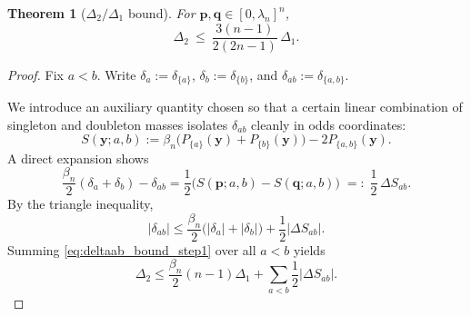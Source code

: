 \documentclass[11pt]{amsart}
\numberwithin{equation}{section}
\newtheorem{theorem}{Theorem}[section]
\theoremstyle{definition}
\newcommand{\abs}[1]{\left|#1\right|}
\newcommand{\vct}[1]{\mathbf{#1}}
\newcommand{\pvec}{\vct{p}}
\newcommand{\qvec}{\vct{q}}
\newcommand{\yvec}{\vct{y}}
\newcommand{\lam}{\lambda}
\begin{document}
\begin{theorem}[$\Delta_2/\Delta_1$ bound]\label{thm:Delta2_bound}
For $\pvec,\qvec\in[0,\lam_n]^n$,
\[
\Delta_2\ \le\ \frac{3(n-1)}{2(2n-1)}\,\Delta_1.
\]
\end{theorem}

\begin{proof}
Fix $a<b$.
Write $\delta_a:=\delta_{\{a\}}$, $\delta_b:=\delta_{\{b\}}$, and $\delta_{ab}:=\delta_{\{a,b\}}$.

We introduce an auxiliary quantity chosen so that a certain linear combination of singleton and doubleton masses isolates $\delta_{ab}$ cleanly in odds coordinates:
\[
S(\yvec;a,b)
:=\beta_n\big(P_{\{a\}}(\yvec)+P_{\{b\}}(\yvec)\big)-2P_{\{a,b\}}(\yvec).
\]
A direct expansion shows
\begin{equation}\label{eq:deltaab_identity}
\frac{\beta_n}{2}(\delta_a+\delta_b)-\delta_{ab}
=\frac12\Big(S(\pvec;a,b)-S(\qvec;a,b)\Big)
\;=:\;\frac12\,\Delta S_{ab}.
\end{equation}
By the triangle inequality,
\begin{equation}\label{eq:deltaab_bound_step1}
\abs{\delta_{ab}}
\le \frac{\beta_n}{2}\big(\abs{\delta_a}+\abs{\delta_b}\big)+\frac12\abs{\Delta S_{ab}}.
\end{equation}
Summing \eqref{eq:deltaab_bound_step1} over all $a<b$ yields
\begin{equation}\label{eq:Delta2_split}
\Delta_2
\le \frac{\beta_n}{2}(n-1)\Delta_1+\sum_{a<b}\frac12\abs{\Delta S_{ab}}.
\end{equation}


\end{proof}
\end{document}
